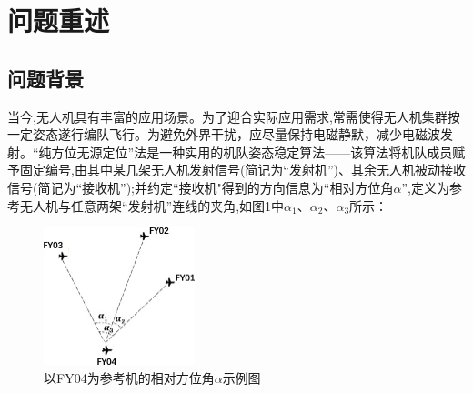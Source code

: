 \documentclass[withoutpreface,bwprint]{cumcmthesis} %
\begin{document}
	\section{问题重述}
	\subsection{问题背景}
			
			当今,无人机具有丰富的应用场景。为了迎合实际应用需求,常需使得无人机集群按一定姿态遂行编队飞行。为避免外界干扰，应尽量保持电磁静默，减少电磁波发射。“纯方位无源定位”法是一种实用的机队姿态稳定算法——该算法将机队成员赋予固定编号,由其中某几架无人机发射信号(简记为“发射机”)、其余无人机被动接收信号(简记为“接收机”);并约定“接收机"得到的方向信息为“相对方位角$\alpha$”,定义为参考无人机与任意两架“发射机”连线的夹角,如图1中$\alpha_{1}$、$\alpha_{2}$、$\alpha_{3}$所示：
			
				\begin{figure}[htbp!]
					\centering
					\includegraphics[height=4cm]{./figures/1-1.png}
					\caption{以FY04为参考机的相对方位角$\alpha$示例图}
					\label{fig:1}
				\end{figure}
			
\end{document}
